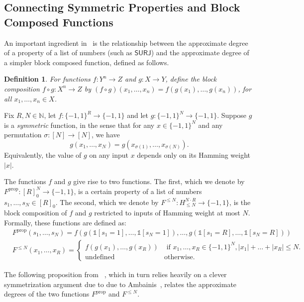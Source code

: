 \documentclass[11pt, letterpaper, fleqn]{article}
\newtheorem{definition}[theorem]{Definition}
\theoremstyle{plain}
\newcommand{\SURJ}{\mathsf{ SURJ}}
\newcommand{\bits}{\{-1,1\}}
\newcommand{\N}{\mathbb{N}}
\newcommand{\id}{{\mathds{1}}}
\begin{document}
\subsection{Connecting Symmetric Properties and Block Composed Functions}
\label{sec:step1}

An important ingredient in~\cite{adegsurj} is the relationship between the approximate degree of a property of a list of numbers (such as $\SURJ$) and the approximate degree of a simpler block composed function, defined as follows.

\begin{definition}
For functions $f : Y^n \to Z$ and $g: X \to Y$, define the \emph{block composition} $f \circ g : X^n \to Z$ by $(f\circ g)(x_1, \dots, x_n) = f(g(x_1), \dots, g(x_n))$, for all $x_1, \dots, x_n \in X$.
\end{definition}


Fix $R, N \in \N$, let $f : \bits^R \to \bits$ and let $g : \bits^N \to \bits$. Suppose $g$ is a \emph{symmetric} function, in the sense that for any $x \in \bits^N$ and any permutation $\sigma : [N] \to [N]$, we have
\[g(x_1, \dots, x_N) = g(x_{\sigma(1)}, \dots, x_{\sigma(N)}).\]
Equivalently, the value of $g$ on any input $x$ depends only on its Hamming weight $|x|$.

The functions $f$ and $g$ give rise to two functions. The first, which we denote by $F^{\operatorname{prop}} : [R]_0^N \to \bits$, is a certain property of a list of numbers $s_1, \dots, s_N \in [R]_0$. The second, which we denote by $F^{\le N} : H_{\le N}^{N \cdot R} \to \bits$, is the block composition of $f$ and $g$ restricted to inputs of Hamming weight at most $N$. Formally, these functions are defined as:
\begin{align*}
&F^{\operatorname{prop}}(s_1, \dots, s_N) = f(g(\id[s_1 = 1], \dots, \id[s_N = 1]), \dots, g(\id[s_1=R], \dots,\id[s_N=R])) \\
&F^{\le N}(x_1, \dots, x_R) = \begin{cases} f(g(x_1), \dots, g(x_R)) & \text{ if } x_1, \dots, x_R \in \bits^N,  |x_1| + \dots + |x_R| \le N.\\
\text{undefined} & \text{otherwise}.
\end{cases}
\end{align*}

The following proposition from ~\cite{adegsurj}, which in turn relies heavily on a clever symmetrization argument due to due to Ambainis~\cite{ambainissmallrange}, relates the approximate degrees of the two functions $F^{\operatorname{prop}}$ and $F^{\le N}$.
\end{document}
